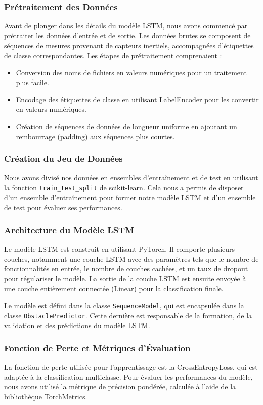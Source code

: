 \subsubsection{Prétraitement des Données}
Avant de plonger dans les détails du modèle LSTM, nous avons commencé par prétraiter les données d'entrée et de sortie. Les données brutes se composent de séquences de mesures provenant de capteurs inertiels, accompagnées d'étiquettes de classe correspondantes. Les étapes de prétraitement comprenaient :
\begin{itemize}
  \item Conversion des noms de fichiers en valeurs numériques pour un traitement plus facile.
  \item Encodage des étiquettes de classe en utilisant LabelEncoder pour les convertir en valeurs numériques.
  \item Création de séquences de données de longueur uniforme en ajoutant un rembourrage (padding) aux séquences plus courtes.
\end{itemize}

\subsubsection{Création du Jeu de Données}
Nous avons divisé nos données en ensembles d'entraînement et de test en utilisant la fonction \texttt{train\_test\_split} de scikit-learn. Cela nous a permis de disposer d'un ensemble d'entraînement pour former notre modèle LSTM et d'un ensemble de test pour évaluer ses performances.

\subsubsection{Architecture du Modèle LSTM}
Le modèle LSTM est construit en utilisant PyTorch. Il comporte plusieurs couches, notamment une couche LSTM avec des paramètres tels que le nombre de fonctionnalités en entrée, le nombre de couches cachées, et un taux de dropout pour régulariser le modèle. La sortie de la couche LSTM est ensuite envoyée à une couche entièrement connectée (Linear) pour la classification finale.

Le modèle est défini dans la classe \texttt{SequenceModel}, qui est encapsulée dans la classe \texttt{ObstaclePredictor}. Cette dernière est responsable de la formation, de la validation et des prédictions du modèle LSTM.

\subsubsection{Fonction de Perte et Métriques d'Évaluation}
La fonction de perte utilisée pour l'apprentissage est la CrossEntropyLoss, qui est adaptée à la classification multiclasse. Pour évaluer les performances du modèle, nous avons utilisé la métrique de précision pondérée, calculée à l'aide de la bibliothèque TorchMetrics.

